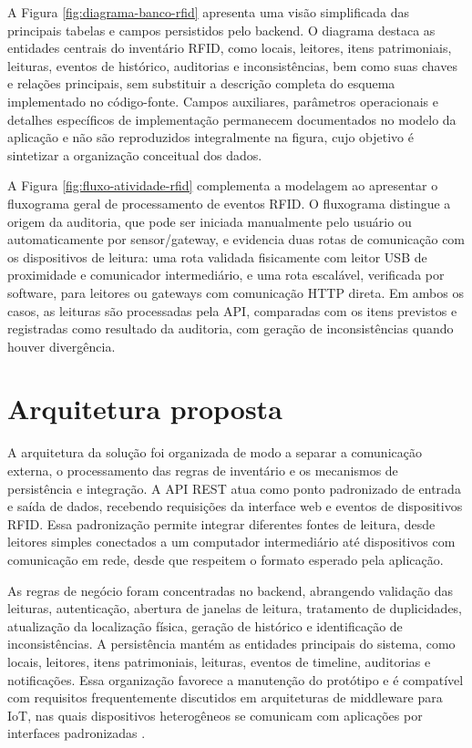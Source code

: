 

A Figura \ref{fig:diagrama-banco-rfid} apresenta uma visão simplificada das principais tabelas e campos persistidos pelo backend. O diagrama destaca as entidades centrais do invent\'ario RFID, como locais, leitores, itens patrimoniais, leituras, eventos de hist\'orico, auditorias e inconsist\^encias, bem como suas chaves e rela\c{c}\~oes principais, sem substituir a descrição completa do esquema implementado no código-fonte. Campos auxiliares, parâmetros operacionais e detalhes específicos de implementação permanecem documentados no modelo da aplicação e não são reproduzidos integralmente na figura, cujo objetivo é sintetizar a organização conceitual dos dados.



A Figura \ref{fig:fluxo-atividade-rfid} complementa a modelagem ao apresentar o fluxograma geral de processamento de eventos RFID. O fluxograma distingue a origem da auditoria, que pode ser iniciada manualmente pelo usuário ou automaticamente por sensor/gateway, e evidencia duas rotas de comunicação com os dispositivos de leitura: uma rota validada fisicamente com leitor USB de proximidade e comunicador intermediário, e uma rota escalável, verificada por software, para leitores ou gateways com comunicação HTTP direta. Em ambos os casos, as leituras são processadas pela API, comparadas com os itens previstos e registradas como resultado da auditoria, com geração de inconsistências quando houver divergência.



\section{Arquitetura proposta}

A arquitetura da solução foi organizada de modo a separar a comunicação externa, o processamento das regras de inventário e os mecanismos de persistência e integração. A API REST atua como ponto padronizado de entrada e saída de dados, recebendo requisições da interface web e eventos de dispositivos RFID. Essa padronização permite integrar diferentes fontes de leitura, desde leitores simples conectados a um computador intermediário até dispositivos com comunicação em rede, desde que respeitem o formato esperado pela aplicação.

As regras de negócio foram concentradas no backend, abrangendo validação das leituras, autenticação, abertura de janelas de leitura, tratamento de duplicidades, atualização da localização física, geração de histórico e identificação de inconsistências. A persistência mantém as entidades principais do sistema, como locais, leitores, itens patrimoniais, leituras, eventos de timeline, auditorias e notificações. Essa organização favorece a manutenção do protótipo e é compatível com requisitos frequentemente discutidos em arquiteturas de middleware para IoT, nas quais dispositivos heterogêneos se comunicam com aplicações por interfaces padronizadas \cite{razzaque2015}.

